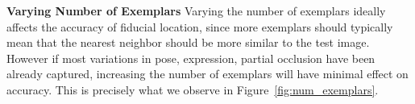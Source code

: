 % 
% 
\textbf{Varying Number of Exemplars}
\label{subsec:varying_number_of_exemplars}
Varying the number of exemplars ideally affects the accuracy of fiducial location, since
more exemplars should typically mean that the nearest neighbor
 should be more similar to the test image. However if most
variations in pose, expression, partial occlusion have been already captured, increasing the number
of exemplars will have minimal effect on accuracy. This is precisely what we observe in
Figure~\ref{fig:num_exemplars}.

